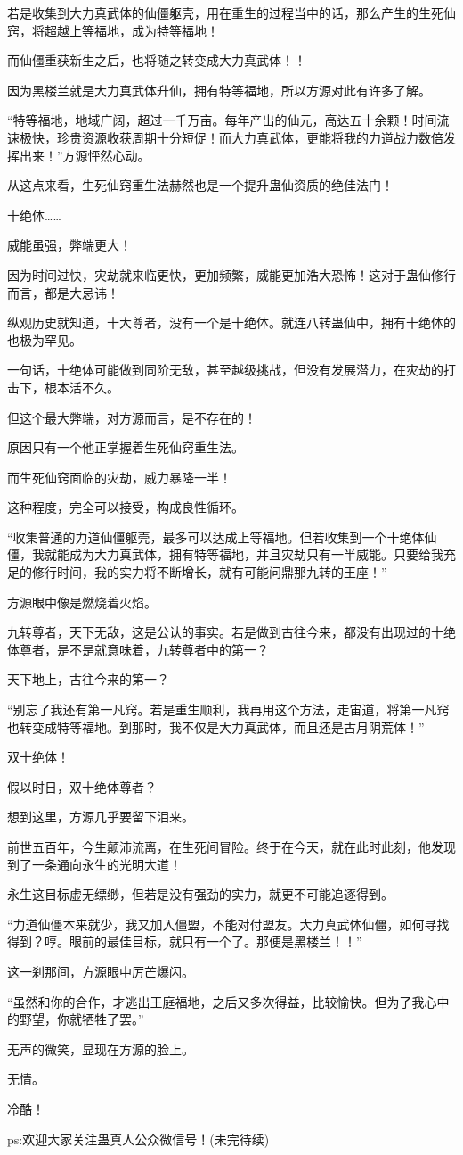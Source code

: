 \begin{this_body}
若是收集到大力真武体的仙僵躯壳，用在重生的过程当中的话，那么产生的生死仙窍，将超越上等福地，成为特等福地！

而仙僵重获新生之后，也将随之转变成大力真武体！！

因为黑楼兰就是大力真武体升仙，拥有特等福地，所以方源对此有许多了解。

“特等福地，地域广阔，超过一千万亩。每年产出的仙元，高达五十余颗！时间流速极快，珍贵资源收获周期十分短促！而大力真武体，更能将我的力道战力数倍发挥出来！”方源怦然心动。

从这点来看，生死仙窍重生法赫然也是一个提升蛊仙资质的绝佳法门！

十绝体……

威能虽强，弊端更大！

因为时间过快，灾劫就来临更快，更加频繁，威能更加浩大恐怖！这对于蛊仙修行而言，都是大忌讳！

纵观历史就知道，十大尊者，没有一个是十绝体。就连八转蛊仙中，拥有十绝体的也极为罕见。

一句话，十绝体可能做到同阶无敌，甚至越级挑战，但没有发展潜力，在灾劫的打击下，根本活不久。

但这个最大弊端，对方源而言，是不存在的！

原因只有一个他正掌握着生死仙窍重生法。

而生死仙窍面临的灾劫，威力暴降一半！

这种程度，完全可以接受，构成良性循环。

“收集普通的力道仙僵躯壳，最多可以达成上等福地。但若收集到一个十绝体仙僵，我就能成为大力真武体，拥有特等福地，并且灾劫只有一半威能。只要给我充足的修行时间，我的实力将不断增长，就有可能问鼎那九转的王座！”

方源眼中像是燃烧着火焰。

九转尊者，天下无敌，这是公认的事实。若是做到古往今来，都没有出现过的十绝体尊者，是不是就意味着，九转尊者中的第一？

天下地上，古往今来的第一？

“别忘了我还有第一凡窍。若是重生顺利，我再用这个方法，走宙道，将第一凡窍也转变成特等福地。到那时，我不仅是大力真武体，而且还是古月阴荒体！”

双十绝体！

假以时日，双十绝体尊者？

想到这里，方源几乎要留下泪来。

前世五百年，今生颠沛流离，在生死间冒险。终于在今天，就在此时此刻，他发现到了一条通向永生的光明大道！

永生这目标虚无缥缈，但若是没有强劲的实力，就更不可能追逐得到。

“力道仙僵本来就少，我又加入僵盟，不能对付盟友。大力真武体仙僵，如何寻找得到？哼。眼前的最佳目标，就只有一个了。那便是黑楼兰！！”

这一刹那间，方源眼中厉芒爆闪。

“虽然和你的合作，才逃出王庭福地，之后又多次得益，比较愉快。但为了我心中的野望，你就牺牲了罢。”

无声的微笑，显现在方源的脸上。

无情。

冷酷！

ps:欢迎大家关注蛊真人公众微信号！(未完待续)

\end{this_body}

